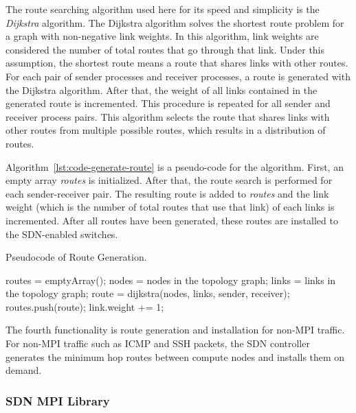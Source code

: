 The route searching algorithm used here for its speed and simplicity is
the \emph{Dijkstra} algorithm. The Dijkstra
algorithm solves the shortest route problem for a graph with
non-negative link weights. In this algorithm, link weights are
considered the number of total routes that go through that link. Under
this assumption, the shortest route means a route that shares links with
other routes. For each pair of sender processes and receiver processes,
a route is generated with the Dijkstra algorithm. After that, the weight
of all links contained in the generated route is incremented. This
procedure is repeated for all sender and receiver process pairs. This
algorithm selects the route that shares links with other routes from
multiple possible routes, which results in a distribution of routes.

Algorithm~\ref{lst:code-generate-route} is a pseudo-code for the algorithm.
First, an empty array \emph{routes} is initialized. After that, the
route search is performed for each sender-receiver pair. The resulting
route is added to \emph{routes} and the link weight (which is the number
of total routes that use that link) of each links is incremented. After
all routes have been generated, these routes are installed to the
SDN-enabled switches.

\begin{algorithm}
    \caption{Pseudocode of Route Generation.}%
    \label{lst:code-generate-route}
    \begin{algorithmic}
        \STATE routes = emptyArray();
        \STATE nodes = nodes in the topology graph;
        \STATE links = links in the topology graph;
            \STATE route = dijkstra(nodes, links, sender, receiver);
            \STATE routes.push(route);
                \STATE link.weight += 1;
            \ENDFOR
        \ENDFOR
    \end{algorithmic}
\end{algorithm}

The fourth functionality is route generation and installation for
non-MPI traffic. For non-MPI traffic such as ICMP and SSH packets, the
SDN controller generates the minimum hop routes between compute nodes
and installs them on demand.

\subsubsection{SDN MPI Library}

